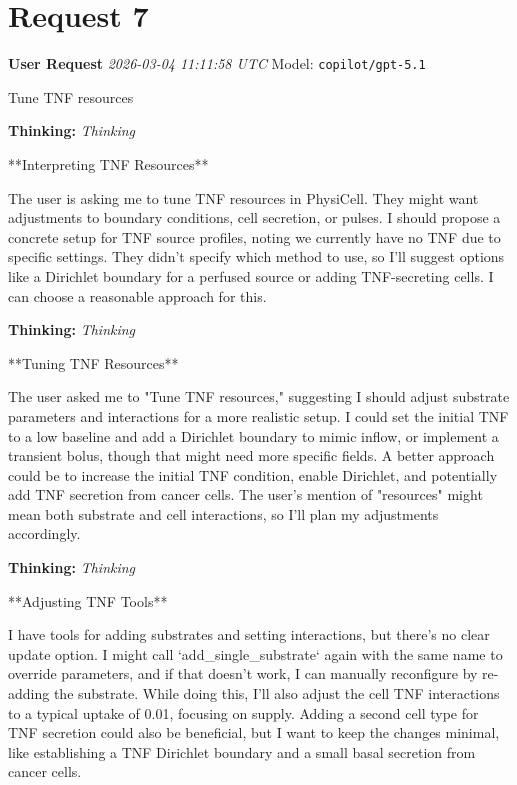 \documentclass[11pt,a4paper]{article}
\begin{document}
\section{Request 7}
\begin{userbox}
\textbf{User Request}
\quad \textit{2026-03-04 11:11:58 UTC}
\quad Model: \texttt{copilot/gpt-5.1}

Tune TNF resources

\end{userbox}
\begin{thinkbox}
\textbf{Thinking:} \textit{Thinking}

**Interpreting TNF Resources**

The user is asking me to tune TNF resources in PhysiCell. They might want adjustments to boundary conditions, cell secretion, or pulses. I should propose a concrete setup for TNF source profiles, noting we currently have no TNF due to specific settings. They didn't specify which method to use, so I’ll suggest options like a Dirichlet boundary for a perfused source or adding TNF-secreting cells. I can choose a reasonable approach for this.

\end{thinkbox}
\begin{thinkbox}
\textbf{Thinking:} \textit{Thinking}

**Tuning TNF Resources**

The user asked me to "Tune TNF resources," suggesting I should adjust substrate parameters and interactions for a more realistic setup. I could set the initial TNF to a low baseline and add a Dirichlet boundary to mimic inflow, or implement a transient bolus, though that might need more specific fields. A better approach could be to increase the initial TNF condition, enable Dirichlet, and potentially add TNF secretion from cancer cells. The user's mention of "resources" might mean both substrate and cell interactions, so I’ll plan my adjustments accordingly.

\end{thinkbox}
\begin{thinkbox}
\textbf{Thinking:} \textit{Thinking}

**Adjusting TNF Tools**

I have tools for adding substrates and setting interactions, but there’s no clear update option. I might call `add\_single\_substrate` again with the same name to override parameters, and if that doesn't work, I can manually reconfigure by re-adding the substrate. While doing this, I’ll also adjust the cell TNF interactions to a typical uptake of 0.01, focusing on supply. Adding a second cell type for TNF secretion could also be beneficial, but I want to keep the changes minimal, like establishing a TNF Dirichlet boundary and a small basal secretion from cancer cells.

\end{thinkbox}
\end{document}
